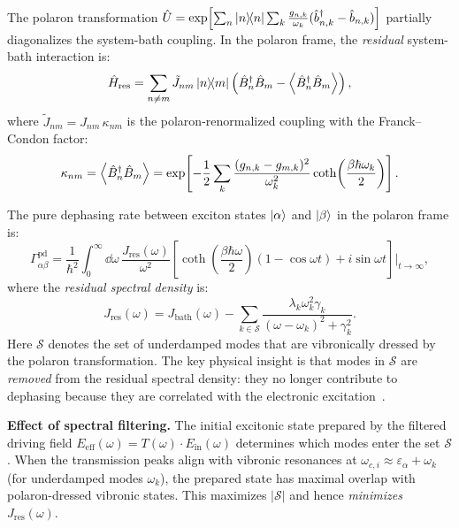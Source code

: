 \documentclass[11pt,a4paper]{article}
\begin{document}
The polaron transformation $\hat{U} = \exp\!\left[\sum_n \dyad{n} \sum_k \frac{g_{n,k}}{\omega_k}(\hat{b}_{n,k}^\dagger - \hat{b}_{n,k})\right]$ partially diagonalizes the system-bath coupling. In the polaron frame, the \textit{residual} system-bath interaction is:
\begin{equation}
\hat{H}_{\mathrm{res}} = \sum_{n \neq m} \tilde{J}_{nm} \dyad{n}{m} \left(\hat{B}_n^\dagger \hat{B}_m - \expval{\hat{B}_n^\dagger \hat{B}_m}\right),
\label{eq:SI_residual}
\end{equation}
where $\tilde{J}_{nm} = J_{nm}\, \kappa_{nm}$ is the polaron-renormalized coupling with the Franck--Condon factor:
\begin{equation}
\kappa_{nm} = \expval{\hat{B}_n^\dagger \hat{B}_m} = \exp\!\left[-\frac{1}{2}\sum_k \frac{(g_{n,k} - g_{m,k})^2}{\omega_k^2} \coth\!\left(\frac{\beta\hbar\omega_k}{2}\right)\right].
\label{eq:SI_FC_factor}
\end{equation}

The pure dephasing rate between exciton states $\ket{\alpha}$ and $\ket{\beta}$ in the polaron frame is:
\begin{equation}
\Gamma_{\alpha\beta}^{\mathrm{pd}} = \frac{1}{\hbar^2} \int_0^\infty \dd{\omega}\, \frac{J_{\mathrm{res}}(\omega)}{\omega^2} \left[\coth\!\left(\frac{\beta\hbar\omega}{2}\right)(1 - \cos\omega t) + i\sin\omega t\right]\bigg|_{t\to\infty},
\label{eq:SI_dephasing_rate}
\end{equation}
where the \textit{residual spectral density} is:
\begin{equation}
\boxed{J_{\mathrm{res}}(\omega) = J_{\mathrm{bath}}(\omega) - \sum_{k \in \mathcal{S}} \frac{\lambda_k \omega_k^2 \gamma_k}{(\omega - \omega_k)^2 + \gamma_k^2}.}
\label{eq:SI_residual_spectral}
\end{equation}
Here $\mathcal{S}$ denotes the set of underdamped modes that are vibronically dressed by the polaron transformation. The key physical insight is that modes in $\mathcal{S}$ are \textit{removed} from the residual spectral density: they no longer contribute to dephasing because they are correlated with the electronic excitation~\cite{Chin2011,Chin2013}.

\textbf{Effect of spectral filtering.} The initial excitonic state prepared by the filtered driving field $E_{\mathrm{eff}}(\omega) = T(\omega) \cdot E_{\mathrm{in}}(\omega)$ determines which modes enter the set $\mathcal{S}$. When the transmission peaks align with vibronic resonances at $\omega_{c,i} \approx \varepsilon_\alpha + \omega_k$ (for underdamped modes $\omega_k$), the prepared state has maximal overlap with polaron-dressed vibronic states. This maximizes $|\mathcal{S}|$ and hence \textit{minimizes} $J_{\mathrm{res}}(\omega)$.
\end{document}
